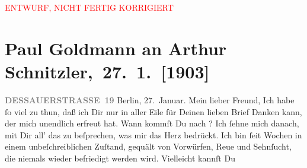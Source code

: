 
\begin{center}
            \textcolor{red}{ENTWURF, NICHT FERTIG KORRIGIERT}
                      \end{center}
            
         
         \renewcommand{\erwaehntePersonen}{Personen: Olga Schnitzler, ?? [Besitzer des Palasthotels Berlin, Anfang 1903]}
         \renewcommand{\erwaehnteInstitutionen}{Institutionen: Palasthotel Berlin}
         \renewcommand{\erwaehnteOrte}{Orte: Berlin, Dessauer Straße, Palasthotel Berlin, Wien}
         \renewcommand{\erwaehnteWerke}{}
               \section[ Paul Goldmann an Arthur Schnitzler, 27. 1. {[}1903{]}]{ Paul Goldmann an Arthur Schnitzler, 27. 1. {[}1903{]}}\nopagebreak{}\rehead{ }\begin{ledgroupsized}[t]{13cm}\normalsize\beginnumbering \toendnotes[C]{\smallbreak\pagebreak[2]} 
\toendnotes[C]{\smallbreak}\pstart
           \noindent{}\raggedleft{}{\pb}\textcolor{gray}{\textbf{DESSAUERSTRASSE 19}}\pend
           \pstart
           Berlin, 27. Januar.\pend
           \pstart\center{}Mein lieber Freund,\pend\pstart
           Ich habe ſo viel zu thun, daß ich Dir nur in aller Eile für Deinen lieben Brief
               Danken kann, der mich unendlich erfreut hat. Wann kommſt Du nach \label{K_L03361-1v}\label{K_L03361-1h}? Ich ſehne mich danach, mit
               Dir all’ das zu beſprechen, was mir das Herz bedrückt. Ich bin ſeit Wochen in einem
               unbeſchreiblichen Zuſtand, gequält von Vorwürfen, Reue und Sehnſucht, die niemals {\pb}wieder befriedigt werden wird. Vielleicht kannſt Du

\end{ledgroupsized}
